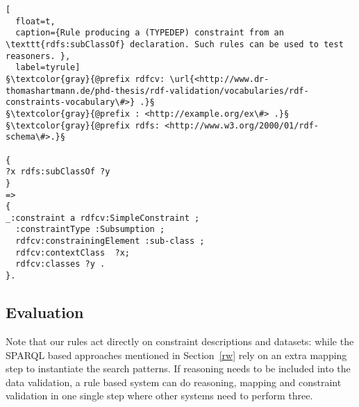 \begin{lstlisting}[
  float=t,
  caption={Rule producing a (TYPEDEP) constraint from an \texttt{rdfs:subClassOf} declaration. Such rules can be used to test reasoners. },
  label=tyrule]
§\textcolor{gray}{@prefix rdfcv: \url{<http://www.dr-thomashartmann.de/phd-thesis/rdf-validation/vocabularies/rdf-constraints-vocabulary\#>} .}§
§\textcolor{gray}{@prefix : <http://example.org/ex\#> .}§
§\textcolor{gray}{@prefix rdfs: <http://www.w3.org/2000/01/rdf-schema\#>.}§

{
?x rdfs:subClassOf ?y
}
=>
{
_:constraint a rdfcv:SimpleConstraint ;
  :constraintType :Subsumption ;
  rdfcv:constrainingElement :sub-class ;
  rdfcv:contextClass  ?x;
  rdfcv:classes ?y .
}.
\end{lstlisting}

% 
% 
% 
% 
% 

\subsection{Evaluation}
Note that our rules act directly on constraint descriptions and \rdf datasets: while the SPARQL based approaches \cite{hartmann2016,kontokostas2014test} mentioned 
in Section~\ref{rw} rely on an extra mapping step
to instantiate the search patterns. If reasoning needs to be included into the data validation, a rule based system can do reasoning, mapping and constraint validation 
in one single step  where other systems need to perform three.

